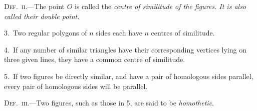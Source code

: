 \documentclass[oneside]{book}
\begin{document}
\textsc{Def.~ii.}---The point $O$ is called the \emph{centre of similitude
of the figures. It is also called their double point.}

\smallskip
\begin{footnotesize}
3.~Two regular polygons of $n$ sides each have $n$ centres of
similitude.


4.~If any number of similar triangles have their corresponding
vertices lying on three given lines, they have a common centre of
similitude.

5.~If two figures be directly similar, and have a pair of homologous
sides parallel, every pair of homologous sides will be
parallel.
\par\end{footnotesize}

\textsc{Def.~iii.}---Two figures, such as those in 5, are said
to be \emph{homothetic}.
\end{document}
